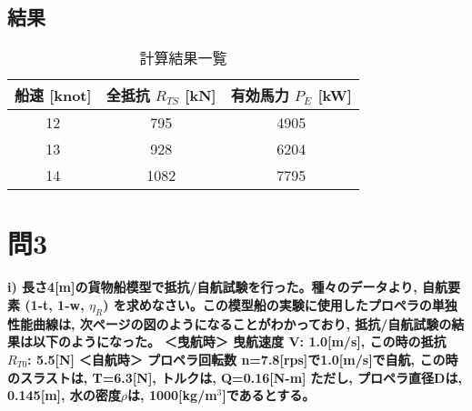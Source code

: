 \documentclass[12pt, a4paper, leqno, dvipdfmx]{jarticle}
\begin{document}
\subsection*{結果}
\begin{table}[H]
    \centering
    \caption{計算結果一覧}
    \begin{tabular}{ccc}
        \toprule
        船速 [knot] & 全抵抗 $R_{TS}$ [kN] & 有効馬力 $P_E$ [kW] \\
        \midrule
        12 & 795 & 4905 \\
        13 & 928 & 6204 \\
        14 & 1082 & 7795 \\
        \bottomrule
    \end{tabular}
\end{table}

\newpage
\section*{問3}
\textbf{i) 長さ4[m]の貨物船模型で抵抗/自航試験を行った。種々のデータより, 自航要素 (1-t, 1-w, $\eta_R$) を求めなさい。この模型船の実験に使用したプロペラの単独性能曲線は, 次ページの図のようになることがわかっており, 抵抗/自航試験の結果は以下のようになった。}
\textbf{＜曳航時＞ 曳航速度 V: 1.0[m/s], この時の抵抗 $R_{T0}$: 5.5[N]}
\textbf{＜自航時＞ プロペラ回転数 n=7.8[rps]で1.0[m/s]で自航, この時のスラストは, T=6.3[N], トルクは, Q=0.16[N-m]}
\textbf{ただし, プロペラ直径Dは, 0.145[m], 水の密度$\rho$は, 1000[kg/m$^3$]であるとする。}

\vspace{5mm}
\end{document}
